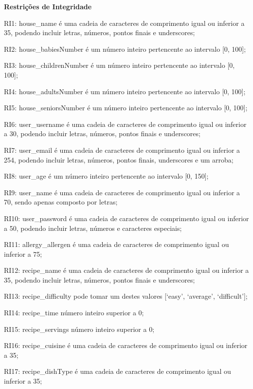 \noindent\textbf{Restrições de Integridade}
\begin{description}
	\item RI1: house\_name é uma cadeia de caracteres de comprimento igual ou inferior a 35, podendo incluir letras, números, pontos finais e underscores;
	\item RI2: house\_babiesNumber é um número inteiro pertencente ao intervalo [0, 100];
	\item RI3: house\_childrenNumber é um número inteiro pertencente ao intervalo [0, 100];
	\item RI4: house\_adultsNumber é um número inteiro pertencente ao intervalo [0, 100];
	\item RI5: house\_seniorsNumber é um número inteiro pertencente ao intervalo [0, 100];
	\item RI6: user\_username é uma cadeia de caracteres de comprimento igual ou inferior a 30, podendo incluir letras, números, pontos finais e underscores;
	\item RI7: user\_email é uma cadeia de caracteres de comprimento igual ou inferior a 254, podendo incluir letras, números, pontos finais, underscores e um arroba;
	\item RI8: user\_age é um número inteiro pertencente ao intervalo [0, 150];
	\item RI9: user\_name é uma cadeia de caracteres de comprimento igual ou inferior a 70, sendo apenas composto por letras;
	\item RI10: user\_password é uma cadeia de caracteres de comprimento igual ou inferior a 50, podendo incluir letras, números e caracteres especiais;
	\item RI11: allergy\_allergen é uma cadeia de caracteres de comprimento igual ou inferior a 75;
	\item RI12: recipe\_name é uma cadeia de caracteres de comprimento igual ou inferior a 35, podendo incluir letras, números, pontos finais e underscores;
	\item RI13: recipe\_difficulty pode tomar um destes valores [‘easy’, ‘average’, ‘difficult’];
	\item RI14: recipe\_time número inteiro superior a 0;
	\item RI15: recipe\_servings número inteiro superior a 0;
	\item RI16: recipe\_cuisine é uma cadeia de caracteres de comprimento igual ou inferior a 35;
	\item RI17: recipe\_dishType é uma cadeia de caracteres de comprimento igual ou inferior a 35;

\end{description}
